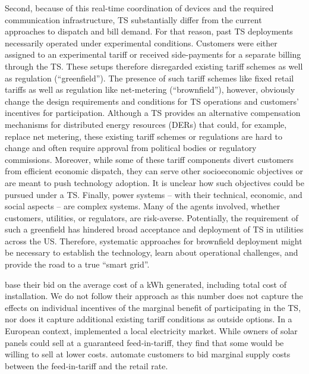 Second, because of this real-time coordination of devices and the required communication infrastructure, TS substantially differ from the current approaches to dispatch and bill demand. 
For that reason, past TS deployments necessarily operated under experimental conditions. Customers were either assigned to an experimental tariff or received side-payments for a separate billing through the TS. These setups therefore disregarded existing tariff schemes as well as regulation (``greenfield'').
The presence of such tariff schemes like fixed retail tariffs as well as regulation like net-metering (``brownfield''), however, obviously change the design requirements and conditions for TS operations and customers' incentives for participation. 
Although a TS provides an alternative compensation mechanisms for distributed energy resources (DERs) that could, for example, replace net metering, these existing tariff schemes or regulations are hard to change and often require approval from political bodies or regulatory commissions. 
Moreover, while some of these tariff components divert customers from efficient economic dispatch, they can serve other socioeconomic objectives or are meant to push technology adoption. It is unclear how such objectives could be pursued under a TS.
Finally, power systems -- with their technical, economic, and social aspects -- are complex systems. Many of the agents involved, whether customers, utilities, or regulators, are risk-averse. 
Potentially, the requirement of such a greenfield has hindered broad acceptance and deployment of TS in utilities across the US. Therefore, systematic approaches for brownfield deployment might be necessary to establish the technology, learn about operational challenges, and provide the road to a true ``smart grid''.


\citet{sajjadi_transactive_2016} base their bid on the average cost of a kWh generated, including total cost of installation. We do not follow their approach as this number does not capture the effects on individual incentives of the marginal benefit of participating in the TS, nor does it capture additional existing tariff conditions as outside options. In a European context, \citet{ableitner_user_2020} implemented a local electricity market. While owners of solar panels could sell at a guaranteed feed-in-tariff, they find that some would be willing to sell at lower costs. \citet{mengelkamp_decentralizing_2018} automate customers to bid marginal supply costs between the feed-in-tariff and the retail rate.


